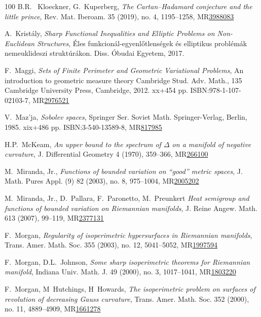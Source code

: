 \documentclass[a4paper,11pt,reqno]{amsart}
\theoremstyle{plain}
\numberwithin{equation}{section} \allowdisplaybreaks
\begin{document}
\begin{thebibliography}{100}
 B.R.~ Kloeckner, G.~Kuperberg, \emph{The Cartan–Hadamard conjecture and the little prince}, Rev. Mat. Iberoam. 35 (2019), no. 4, 1195–1258, MR\href{https://doi.org/10.4171/rmi/1082}{3988083}



 A.~Krist\'aly, \emph{Sharp Functional Inequalities and Elliptic Problems on Non-Euclidean Structures}, Éles funkcionál-egyenlőtlenségek és elliptikus problémák nemeuklideszi struktúrákon. Diss. Óbudai Egyetem, 2017.

 F.~Maggi, \emph{ Sets of Finite Perimeter and Geometric Variational Problems}, An introduction to geometric measure theory
Cambridge Stud. Adv. Math., 135
Cambridge University Press, Cambridge, 2012. xx+454 pp.
ISBN:978-1-107-02103-7, MR\href{https://doi.org/10.1017/CBO9781139108133}{2976521}

 V.~Maz'ja, \emph{Sobolev spaces}, Springer Ser. Soviet Math.
Springer-Verlag, Berlin, 1985. xix+486 pp.
ISBN:3-540-13589-8, MR\href{https://doi.org/10.1007/978-3-662-09922-3}{817985}

 H.P.~McKeam, \emph{An upper bound to the spectrum of $\Delta$ on
a manifold of negative curvature}, J. Differential Geometry 4 (1970), 359–366, MR\href{http://projecteuclid.org/euclid.jdg/1214429509}{266100}

 M.~Miranda, Jr., \emph{ Functions of bounded variation on “good” metric spaces}, J. Math. Pures Appl. (9) 82 (2003), no. 8, 975–1004, MR\href{https://doi.org/10.1016/S0021-7824(03)00036-9}{2005202}

 M.~Miranda, Jr., D.~Pallara, F.~Paronetto, M.~Preunkert \emph{Heat semigroup and functions of 
bounded variation on Riemannian manifolds}, J. Reine Angew. Math. 613 (2007), 99–119, MR\href{https://doi.org/10.1515/CRELLE.2007.093}{2377131}

 F.~Morgan, \emph{ Regularity of isoperimetric hypersurfaces in Riemannian manifolds}, Trans. Amer. Math. Soc. 355 (2003), no. 12, 5041–5052, MR\href{https://doi.org/10.1090/S0002-9947-03-03061-7}{1997594}

 F.~Morgan, D.L.~Johnson, \emph{Some sharp isoperimetric theorems for Riemannian manifold}, Indiana Univ. Math. J. 49 (2000), no. 3, 1017–1041, MR\href{https://doi.org/10.1512/iumj.2000.49.1929}{1803220}



 F.~Morgan, M~Hutchings, H~Howards, \emph{The isoperimetric problem on surfaces of revolution of decreasing Gauss curvature}, Trans. Amer. Math. Soc. 352 (2000), no. 11, 4889–4909, MR\href{https://doi.org/10.1090/S0002-9947-00-02482-X}{1661278}


\end{thebibliography}
\end{document}
